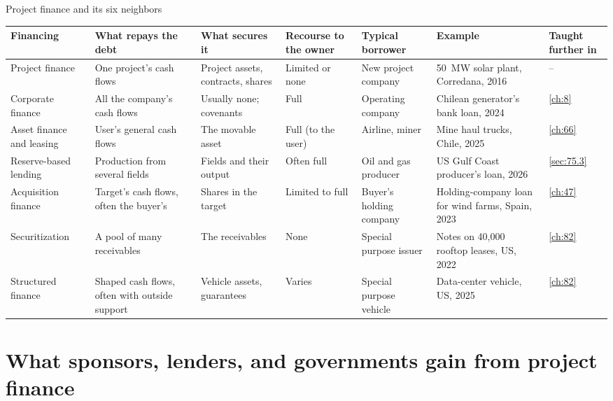 \begin{exhibit}[H]
\caption{Project finance and its six neighbors \illustrative}\label{exh:2.2}
\small
\begin{tabularx}{\linewidth}{@{}>{\raggedright\arraybackslash}p{15mm} L L >{\raggedright\arraybackslash}p{13mm} L L >{\raggedright\arraybackslash}p{13mm}@{}}
\toprule
Financing & What repays the debt & What secures it & Recourse to the owner & Typical borrower & Example & Taught further in\\
\midrule
Project finance & One project's cash flows & Project assets, contracts, shares & Limited or none & New project company & 50~MW solar plant, Corredana, 2016 & --\\
Corporate finance & All the company's cash flows & Usually none; covenants & Full & Operating company & Chilean generator's bank loan, 2024 & \cref{ch:8}\\
Asset finance and leasing & User's general cash flows & The movable asset & Full (to the user) & Airline, miner & Mine haul trucks, Chile, 2025 & \cref{ch:66}\\
Reserve-based lending & Production from several fields & Fields and their output & Often full & Oil and gas producer & US Gulf Coast producer's loan, 2026 & \cref{sec:75.3}\\
Acquisition finance & Target's cash flows, often the buyer's & Shares in the target & Limited to full & Buyer's holding company & Holding-company loan for wind farms, Spain, 2023 & \cref{ch:47}\\
Securitization & A pool of many receivables & The receivables & None & Special purpose issuer & Notes on 40,000 rooftop leases, US, 2022 & \cref{ch:82}\\
Structured finance & Shaped cash flows, often with outside support & Vehicle assets, guarantees & Varies & Special purpose vehicle & Data-center vehicle, US, 2025 & \cref{ch:82}\\
\bottomrule
\end{tabularx}
\end{exhibit}

\section{What sponsors, lenders, and governments gain from project finance}\label{sec:2.5}

